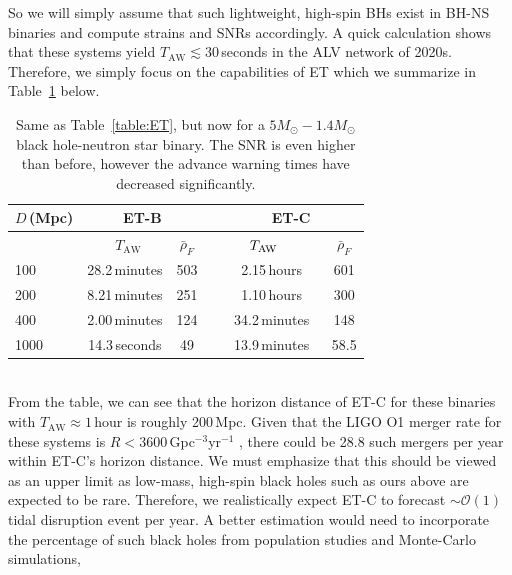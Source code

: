\documentclass[amsmath,amssymb,aps,floats,amsfonts,notitlepage,superscriptaddress,eqsecnum,nofootinbib,10pt]{revtex4-1}
\newcommand\T{\rule{0pt}{2.6ex}}       %
\newcommand\B{\rule[-1.2ex]{0pt}{0pt}} %
\begin{document}
So we will simply assume that such lightweight, high-spin BHs exist in BH-NS binaries and compute strains and SNRs accordingly.
A quick calculation shows that these systems yield $T_\text{AW} \lesssim 30\,$seconds in the ALV network of 2020s. %
Therefore, we simply focus on the capabilities of ET which we summarize in Table~\ref{table:ET_BH_NS} below.
%
%
%
\begin{table}[h]
\centering
\begin{tabular}{l|ccccc}
\hline
$D\,$(Mpc) & \multicolumn{2}{c}{ET-B} &  & \multicolumn{2}{c}{ET-C}\T\B\\
\hline
{}&  \ \hspace{6mm}$T_\text{AW}$ \hspace{8mm} & $\bar{\rho}_{F}$ &{}  & $\hspace{6mm}T_\text{AW} \hspace{10mm}$ & $\bar{\rho}_{F}$\T\B\\

100 &   28.2\,minutes & 503 &{\qquad} &  2.15\,hours & 601\T\\
200 & 8.21\,minutes & 251  &{\qquad} & 1.10\,hours & 300 \\
400 &  2.00\,minutes & 124 &{\qquad} & 34.2\,minutes & 148\\
1000 & 14.3\,seconds & 49 &{\qquad} & 13.9\,minutes& 58.5\\
\hline
\end{tabular}
\caption{Same as Table~\ref{table:ET}, but now for a $5 M_\odot- 1.4 M_\odot$ black hole-neutron star binary.
The SNR is even higher than before, however the advance warning times have decreased significantly.}\label{table:ET_BH_NS}
\end{table}
%
%
\\
\noindent
From the table, we can see that the horizon distance of ET-C for these binaries with $T_\text{AW} \approx 1\,$hour is roughly 200\,Mpc.
Given that the LIGO O1 merger rate for these systems is $ R < 3600\,$Gpc$^{-3}$yr$^{-1}$ \cite{Abbott:2016ymx},
there could be 28.8 such mergers per year within ET-C's horizon distance. We must emphasize that this should be viewed
as an upper limit as low-mass, high-spin black holes such as ours above are expected to be rare.
Therefore, we realistically expect ET-C to forecast $\sim \mathcal{O}(1)$ tidal disruption event per year.
A better estimation would need to incorporate the percentage of such black holes from population studies and Monte-Carlo simulations,
\end{document}
